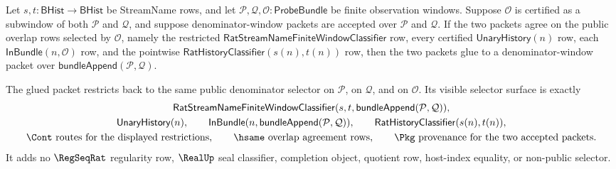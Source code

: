 \begin{theorem}
\label{thm:streamname-regseqrat-denominator-overlap-gluing}
Let $s,t:\mathsf{BHist}\to\mathsf{BHist}$ be StreamName rows, and let
$\mathcal P,\mathcal Q,\mathcal O:\mathsf{ProbeBundle}$ be finite observation
windows. Suppose $\mathcal O$ is certified as a subwindow of both $\mathcal P$
and $\mathcal Q$, and suppose denominator-window packets are accepted over
$\mathcal P$ and $\mathcal Q$. If the two packets agree on the public overlap
rows selected by $\mathcal O$, namely the restricted
$\mathsf{RatStreamNameFiniteWindowClassifier}$ row, every certified
$\mathsf{UnaryHistory}(n)$ row, each $\mathsf{InBundle}(n,\mathcal O)$ row, and
the pointwise $\mathsf{RatHistoryClassifier}(s(n),t(n))$ row, then the two
packets glue to a denominator-window packet over
$\mathsf{bundleAppend}(\mathcal P,\mathcal Q)$.

The glued packet restricts back to the same public denominator selector on
$\mathcal P$, on $\mathcal Q$, and on $\mathcal O$. Its visible selector surface
is exactly
$$
\begin{gathered}
\mathsf{RatStreamNameFiniteWindowClassifier}
(s,t,\mathsf{bundleAppend}(\mathcal P,\mathcal Q)),\\
\mathsf{UnaryHistory}(n),\qquad
\mathsf{InBundle}(n,\mathsf{bundleAppend}(\mathcal P,\mathcal Q)),\qquad
\mathsf{RatHistoryClassifier}(s(n),t(n)),\\
\Cont\text{ routes for the displayed restrictions},\qquad
\hsame\text{ overlap agreement rows},\qquad
\Pkg\text{ provenance for the two accepted packets.}
\end{gathered}
$$
It adds no $\RegSeqRat$ regularity row, $\RealUp$ seal classifier, completion
object, quotient row, host-index equality, or non-public selector.
\end{theorem}
